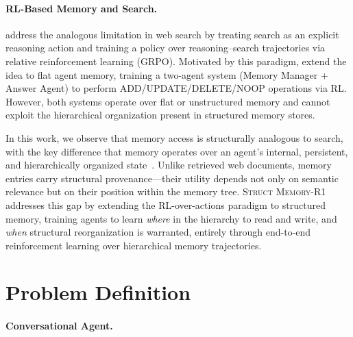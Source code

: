 \documentclass{article}
\theoremstyle{definition}
\begin{document}
\paragraph{RL-Based Memory and Search.}
\citet{jin2025search} address the analogous limitation in web search by treating search as an explicit reasoning action and training a policy over reasoning--search trajectories via relative reinforcement learning (GRPO).
Motivated by this paradigm, \citet{yan2025memory} extend the idea to flat agent memory, training a two-agent system (Memory Manager + Answer Agent) to perform ADD/UPDATE/DELETE/NOOP operations via RL.
However, both systems operate over flat or unstructured memory and cannot exploit the hierarchical organization present in structured memory stores.

In this work, we observe that memory access is structurally analogous to search, with the key difference that memory operates over an agent's internal, persistent, and hierarchically organized state~\citep{park2023generative}.
Unlike retrieved web documents, memory entries carry structural provenance---their utility depends not only on semantic relevance but on their position within the memory tree.
\textsc{Struct Memory-R1} addresses this gap by extending the RL-over-actions paradigm to structured memory, training agents to learn \emph{where} in the hierarchy to read and write, and \emph{when} structural reorganization is warranted, entirely through end-to-end reinforcement learning over hierarchical memory trajectories.
\section{Problem Definition}

\paragraph{Conversational Agent.}
\end{document}
